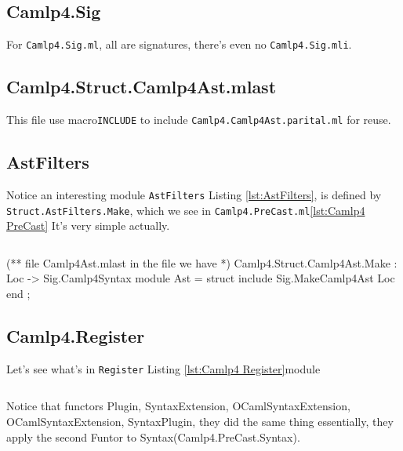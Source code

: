 \inputminted[fontsize=\scriptsize,
firstline=55]{ocaml}{code/camlp4/source/precast.ml}



\subsection{Camlp4.Sig}
For \verb|Camlp4.Sig.ml|, all are signatures, there's even no
\verb|Camlp4.Sig.mli|.



\subsection{Camlp4.Struct.Camlp4Ast.mlast} 

This file use macro\verb|INCLUDE| to include
\verb|Camlp4.Camlp4Ast.parital.ml| for reuse.


\subsection{AstFilters}    
Notice an interesting module \verb|AstFilters| Listing
\ref{lst:AstFilters}, is defined by \verb|Struct.AstFilters.Make|,
which we see in \verb|Camlp4.PreCast.ml|\ref{lst:Camlp4 PreCast} It's
very simple actually.


\inputminted[fontsize=\scriptsize,]{ocaml}{code/camlp4/source/AstFilters.ml}



\begin{ocamlcode}
(** file Camlp4Ast.mlast   in the file we have *)
Camlp4.Struct.Camlp4Ast.Make : Loc -> Sig.Camlp4Syntax
  module Ast = struct
     include Sig.MakeCamlp4Ast Loc 
  end ;
\end{ocamlcode}


\subsection{Camlp4.Register}
Let's see what's in \verb|Register| Listing \ref{lst:Camlp4
  Register}module


\inputminted[fontsize=\scriptsize,
]{ocaml}{code/camlp4/source/Register.ml}

Notice that functors Plugin, SyntaxExtension, OCamlSyntaxExtension,
OCamlSyntaxExtension, SyntaxPlugin, they did the same thing
essentially, they apply the second Funtor to
Syntax(Camlp4.PreCast.Syntax).

